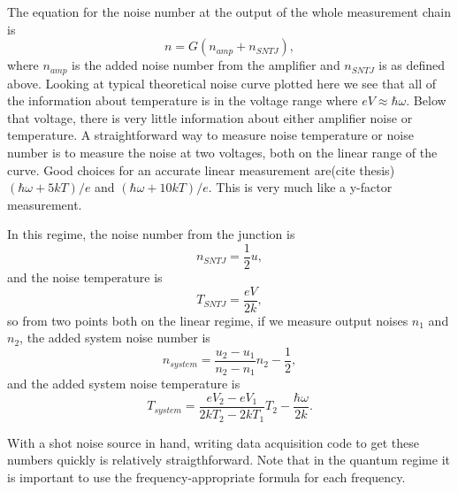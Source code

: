 \documentclass[11pt]{article}
\begin{document}
The equation for the noise number at the output of the whole measurement chain is
$$
n = G(n_{amp} + n_{SNTJ}),
$$
where $n_{amp}$ is the added noise number from the amplifier and $n_{SNTJ}$ is as defined above.  Looking at typical theoretical noise curve plotted here we see that all of the information about temperature is in the voltage range where $eV\approx\hbar\omega$.  Below that voltage, there is very little information about either amplifier noise or temperature.  A straightforward way to measure noise temperature or noise number is to measure the noise at two voltages, both on the linear range of the curve.  Good choices for an accurate linear measurement are(cite thesis) $(\hbar\omega + 5 kT)/e$ and $(\hbar\omega + 10 kT)/e$.  This is very much like a y-factor measurement.  

	In this regime, the noise number from the junction is 
$$
n_{SNTJ} =  \frac{1}{2}u,
$$
and the noise temperature is 
$$
T_{SNTJ} = \frac{eV}{2k},
$$
so from two points both on the linear regime, if we measure output noises $n_1$ and$n_2$, the added system noise number is 
$$
n_{system} = \frac{u_2 -  u_1}{n_2 - n_1}n_2 - \frac{1}{2},
$$
and the added system noise temperature is 
$$
T_{system} = \frac{eV_2 - eV_1}{2kT_2 - 2kT_1}T_2 - \frac{\hbar\omega}{2k}.
$$

	With a shot noise source in hand, writing data acquisition code to get these numbers quickly is relatively straigthforward.  Note that in the quantum regime it is important to use the frequency-appropriate formula for each frequency.  
	
\end{document}
